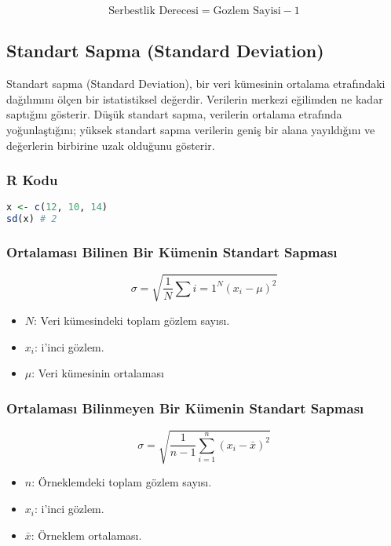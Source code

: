 \[
\text{Serbestlik Derecesi} = \text{Gozlem Sayisi} - 1
\]

\newpage

\subsection{Standart Sapma (Standard Deviation)}
Standart sapma (Standard Deviation), bir veri kümesinin ortalama etrafındaki dağılımını ölçen bir istatistiksel değerdir. Verilerin merkezi eğilimden ne kadar saptığını gösterir. Düşük standart sapma, verilerin ortalama etrafında yoğunlaştığını; yüksek standart sapma verilerin geniş bir alana yayıldığını ve değerlerin birbirine uzak olduğunu gösterir.

\subsubsection{R Kodu}

\begin{lstlisting}[language=R]
x <- c(12, 10, 14)
sd(x) # 2
\end{lstlisting}

\subsubsection{Ortalaması Bilinen Bir Kümenin Standart Sapması}

\[
\sigma = \sqrt{\frac{1}{N} \sum{i=1}^{N} (x_i - \mu)^2}
\]

\begin{itemize}
    \item $N$: Veri kümesindeki toplam gözlem sayısı.
    \item $x_i$: i'inci gözlem.
    \item $\mu$: Veri kümesinin ortalaması
\end{itemize}

\subsubsection{Ortalaması Bilinmeyen Bir Kümenin Standart Sapması}

\[
\sigma = \sqrt{\frac{1}{n-1} \sum_{i=1}^{n} (x_i - \bar{x})^2}
\]

\begin{itemize}
    \item $n$: Örneklemdeki toplam gözlem sayısı.
    \item $x_i$: i'inci gözlem.
    \item $\bar{x}$: Örneklem ortalaması. 
\end{itemize}

